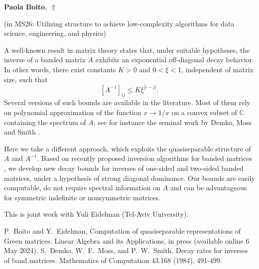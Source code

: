 \documentclass[ILAS2025-program.tex]{subfiles}
\begin{document}
     \hypertarget{down0025}{}\begin{ilasabstract}
    
    \textbf{Paola Boito},  \hfill \hyperlink{up0025}{$\Uparrow$}
    
    (in {\color{mstitle}MS26: Utilizing structure to achieve low-complexity algorithms for data science, engineering, and physics})
        
        \mtskip
    \begin{bibunit}
        A well-known result in matrix theory states that, under suitable hypotheses, the inverse of a banded matrix $A$ exhibits an exponential off-diagonal decay behavior. In other words, there exist constants $K>0$ and $0<\xi<1$, independent of matrix size, such that 
$$
[A^{-1}]_{ij}\leq K \xi^{|i-j|}.
$$
Several versions of such bounds are available in the literature. Most of them rely on polynomial approximation of the function $x\rightarrow 1/x$ on a convex subset of $\mathbb{C}$ containing the spectrum of $A$; see for instance the seminal work by Demko, Moss and Smith \cite{DMS84}.

Here we take a different approach, which exploits the quasiseparable structure of $A$ and $A^{-1}$. Based on recently proposed inversion algorithms for banded matrices \cite{BE23}, we develop new decay bounds for inverses of one-sided and two-sided banded matrices, under a hypothesis of strong diagonal dominance. Our bounds are easily computable, do not require spectral information on $A$ and can be advantageous for symmetric indefinite or nonsymmetric matrices.

This is joint work with Yuli Eidelman (Tel-Aviv University). 


\begin{thebibliography}{99}
P.~Boito and Y.~Eidelman, Computation of quasiseparable representations of Green matrices. Linear Algebra and its Applications, in press (available online 6 May 2024).
S.~Demko, W.~F.~Moss, and P.~W.~Smith,
Decay rates for inverses of band matrices. Mathematics of Computation 43.168 (1984), 491-499.
\end{thebibliography}


        \end{bibunit}
        \end{ilasabstract}
\end{document}
